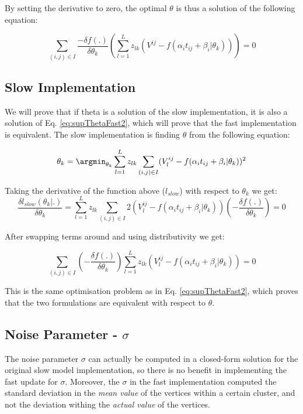 By setting the derivative to zero, the optimal $\theta$ is thus a solution of the following equation:

\begin{equation}
\label{eq:supThetaFast2}
\sum_{(i,j) \in I} \frac{-\delta f(.)}{\delta \theta_k} \left( \sum_{l=1}^L z_{lk} \left( V^{ij} - f(\alpha_i t_{ij} + \beta_i | \theta_k) \right) \right) = 0
\end{equation}


\subsection{Slow Implementation}

We will prove that if theta is a solution of the slow implementation, it is also a solution of Eq. \ref{eq:supThetaFast2}, which will prove that the fast implementation is equivalent. The slow implementation is finding $\theta$ from the following equation:

\begin{equation}
 \theta_k = \argmin_{\theta_k} \sum_{l=1}^L z_{lk} \sum_{(i,j) \in I} (V_l^{ij} - f(\alpha_i t_{ij} + \beta_i | \theta_k))^2
\end{equation}

Taking the derivative of the function above ($l_{slow}$) with respect to $\theta_k$ we get:
\begin{equation}
\frac{\delta l_{slow}(\theta_k|.)}{\delta \theta_k} = \sum_{l=1}^L z_{lk} \sum_{(i,j) \in I} 2 (V_l^{ij} - f(\alpha_i t_{ij} + \beta_i | \theta_k)) \left(-\frac{\delta f(.)}{\delta \theta_k} \right) = 0
\end{equation}

After swapping terms around and using distributivity we get:

\begin{equation}
  \sum_{(i,j) \in I} \left(-\frac{\delta f(.)}{\delta \theta_k} \right) \sum_{l=1}^L z_{lk} (V_l^{ij} - f(\alpha_i t_{ij} + \beta_i | \theta_k))  = 0
\end{equation}

This is the same optimisation problem as in Eq. \ref{eq:supThetaFast2}, which proves that the two formulations are equivalent with respect to $\theta$.

\subsection{Noise Parameter - $\sigma$}

The noise parameter $\sigma$ can actually be computed in a closed-form solution for the original slow model implementation, so there is no benefit in implementing the fast update for $\sigma$. Moreover, the $\sigma$ in the fast implementation computed the standard deviation in the \emph{mean value} of the vertices within a certain cluster, and not the deviation withing the \emph{actual value} of the vertices.

